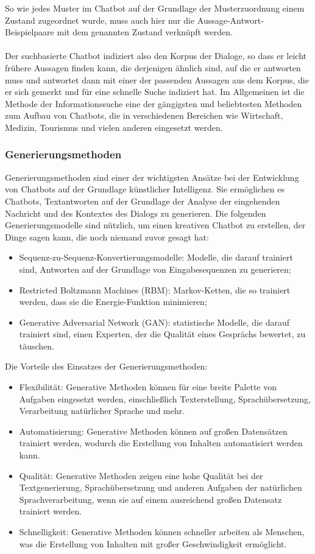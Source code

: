 So wie jedes Muster im Chatbot auf der Grundlage der Musterzuordnung einem Zustand zugeordnet wurde, muss auch hier nur die Aussage-Antwort-Beispielpaare mit dem genannten Zustand verknüpft werden.\\\\
Der suchbasierte Chatbot indiziert also den Korpus der Dialoge, so dass er leicht frühere Aussagen finden kann, die derjenigen ähnlich sind, auf die er antworten muss und antwortet dann mit einer der passenden Aussagen aus dem Korpus, die er sich \glqq{}gemerkt\grqq{} und für eine schnelle Suche indiziert hat. 
Im Allgemeinen ist die Methode der Informationssuche eine der gängigsten und beliebtesten Methoden zum Aufbau von Chatbots, die in verschiedenen Bereichen wie Wirtschaft, Medizin, Tourismus und vielen anderen eingesetzt werden.
\subsubsection{Generierungsmethoden}
Generierungsmethoden sind einer der wichtigsten Ansätze bei der Entwicklung von Chatbots auf der Grundlage künstlicher Intelligenz. 
Sie ermöglichen es Chatbots, Textantworten auf der Grundlage der Analyse der eingehenden Nachricht und des Kontextes des Dialogs zu generieren. 
Die folgenden Generierungsmodelle sind nützlich, um einen kreativen Chatbot zu erstellen, der Dinge sagen kann, die noch niemand zuvor gesagt hat:
\begin{itemize}
    \item Sequenz-zu-Sequenz-Konvertierungsmodelle: Modelle, die darauf trainiert sind, Antworten auf der Grundlage von Eingabesequenzen zu generieren;
    \item Restricted Boltzmann Machines (RBM): Markov-Ketten, die so trainiert werden, dass sie die \glqq{}Energie\grqq{}-Funktion minimieren;
    \item Generative Adversarial Network (GAN): statistische Modelle, die darauf trainiert sind, einen Experten, der die Qualität eines Gesprächs bewertet, zu täuschen.
\end{itemize}
Die Vorteile des Einsatzes der Generierungsmethoden:
\begin{itemize}
    \item Flexibilität: Generative Methoden können für eine breite Palette von Aufgaben eingesetzt werden, einschließlich Texterstellung, Sprachübersetzung, Verarbeitung natürlicher Sprache und mehr.
    \item Automatisierung: Generative Methoden können auf großen Datensätzen trainiert werden, wodurch die Erstellung von Inhalten automatisiert werden kann.
    \item Qualität: Generative Methoden zeigen eine hohe Qualität bei der Textgenerierung, Sprachübersetzung und anderen Aufgaben der natürlichen Sprachverarbeitung, wenn sie auf einem ausreichend großen Datensatz trainiert werden.
    \item Schnelligkeit: Generative Methoden können schneller arbeiten als Menschen, was die Erstellung von Inhalten mit großer Geschwindigkeit ermöglicht.
\end{itemize}
